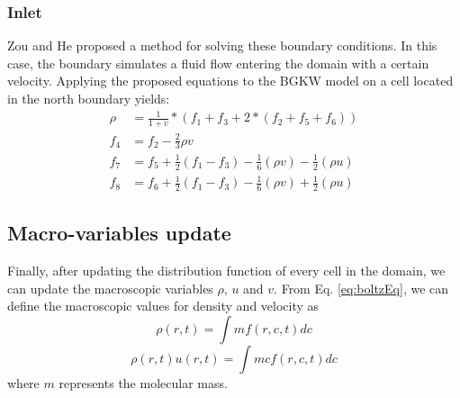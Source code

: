 \documentclass[12pt, openany]{book}
\begin{document}
	\subsubsection{Inlet}
	 Zou and He \cite{zouhe} proposed a method for solving these boundary conditions. In this case, the boundary simulates a fluid flow entering the domain with a certain velocity. Applying the proposed equations to the BGKW model on a cell located in the north boundary yields:
	\begin{equation*}
		\begin{aligned}
			\rho &= \frac{1}{1+v} * \left(f_1 + f_3 + 2 * \left(f_2 + f_5 + f_6\right)\right) \\
			f_4 &= f_2 - \frac{2}{3}\rho v \\
			f_7 &= f_5 + \frac{1}{2}\left(f_1 - f_3\right) - \frac{1}{6}\left(\rho v\right) - \frac{1}{2}\left(\rho u\right) \\
			f_8 &= f_6 + \frac{1}{2}\left(f_1 - f_3\right) - \frac{1}{6}\left(\rho v\right) + \frac{1}{2}\left(\rho u\right)
		\end{aligned}
	\end{equation*}
\subsection{Macro-variables update}\label{sec:mpUpd}
Finally, after updating the distribution function of every cell in the domain, we can update the macroscopic variables $\rho$, $u$ and $v$.
From Eq. \ref{eq:boltzEq}, we can define the macroscopic values for density and velocity as
\begin{equation}\label{eq:densityUp}
\rho (r,t) = \int  mf(r,c,t)dc
\end{equation}
\begin{equation}\label{eq:velocityUp}
\rho (r,t) u(r,t) = \int  mcf(r,c,t)dc
\end{equation}
where $m$ represents the molecular mass.
\end{document}
